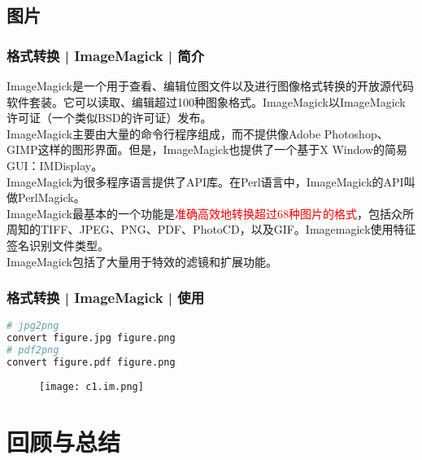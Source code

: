 \subsection{图片}
\begin{frame}
  \frametitle{格式转换 | ImageMagick | 简介}
ImageMagick是一个用于查看、编辑位图文件以及进行图像格式转换的开放源代码软件套装。它可以读取、编辑超过100种图象格式。ImageMagick以ImageMagick许可证（一个类似BSD的许可证）发布。\\
\vspace{1em}
ImageMagick主要由大量的命令行程序组成，而不提供像Adobe Photoshop、GIMP这样的图形界面。但是，ImageMagick也提供了一个基于X Window的简易GUI：IMDisplay。\\
\vspace{1em}
ImageMagick为很多程序语言提供了API库。在Perl语言中，ImageMagick的API叫做PerlMagick。\\
\vspace{1em}
ImageMagick最基本的一个功能是\textcolor{red}{准确高效地转换超过68种图片的格式}，包括众所周知的TIFF、JPEG、PNG、PDF、PhotoCD，以及GIF。Imagemagick使用特征签名识别文件类型。\\
\vspace{1em}
ImageMagick包括了大量用于特效的滤镜和扩展功能。
\end{frame}

\begin{frame}[fragile]
  \frametitle{格式转换 | ImageMagick | 使用}
\begin{lstlisting}[language=bash]
# jpg2png
convert figure.jpg figure.png
# pdf2png
convert figure.pdf figure.png
\end{lstlisting}
  \begin{figure}
    \centering
    \texttt{[image: c1.im.png]}
  \end{figure}
\end{frame}

\section{回顾与总结}
